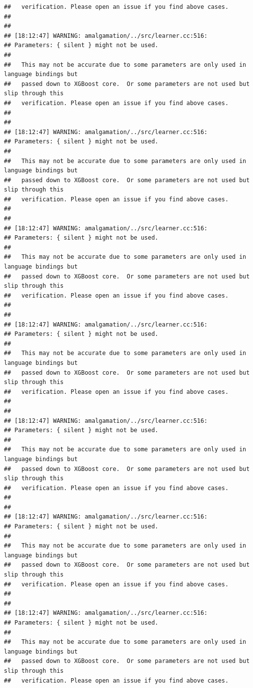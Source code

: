 \documentclass[AMS,STIX2COL]{WileyNJD-v2}\usepackage[]{graphicx}\usepackage[]{color}
\makeatletter
\newenvironment{kframe}{%
 \def\at@end@of@kframe{}%
 \ifinner\ifhmode%
  \def\at@end@of@kframe{\end{minipage}}%
  \begin{minipage}{\columnwidth}%
 \fi\fi%
 \def\FrameCommand##1{\hskip\@totalleftmargin \hskip-\fboxsep
 \colorbox{shadecolor}{##1}\hskip-\fboxsep
     \hskip-\linewidth \hskip-\@totalleftmargin \hskip\columnwidth}%
 \MakeFramed {\advance\hsize-\width
   \@totalleftmargin\z@ \linewidth\hsize
   \@setminipage}}%
 {\par\unskip\endMakeFramed%
 \at@end@of@kframe}
\newenvironment{knitrout}{}{} %
\makeatother
\begin{document}
\begin{knitrout}
\begin{kframe}
\begin{verbatim}
##   verification. Please open an issue if you find above cases.
## 
## 
## [18:12:47] WARNING: amalgamation/../src/learner.cc:516: 
## Parameters: { silent } might not be used.
## 
##   This may not be accurate due to some parameters are only used in language bindings but
##   passed down to XGBoost core.  Or some parameters are not used but slip through this
##   verification. Please open an issue if you find above cases.
## 
## 
## [18:12:47] WARNING: amalgamation/../src/learner.cc:516: 
## Parameters: { silent } might not be used.
## 
##   This may not be accurate due to some parameters are only used in language bindings but
##   passed down to XGBoost core.  Or some parameters are not used but slip through this
##   verification. Please open an issue if you find above cases.
## 
## 
## [18:12:47] WARNING: amalgamation/../src/learner.cc:516: 
## Parameters: { silent } might not be used.
## 
##   This may not be accurate due to some parameters are only used in language bindings but
##   passed down to XGBoost core.  Or some parameters are not used but slip through this
##   verification. Please open an issue if you find above cases.
## 
## 
## [18:12:47] WARNING: amalgamation/../src/learner.cc:516: 
## Parameters: { silent } might not be used.
## 
##   This may not be accurate due to some parameters are only used in language bindings but
##   passed down to XGBoost core.  Or some parameters are not used but slip through this
##   verification. Please open an issue if you find above cases.
## 
## 
## [18:12:47] WARNING: amalgamation/../src/learner.cc:516: 
## Parameters: { silent } might not be used.
## 
##   This may not be accurate due to some parameters are only used in language bindings but
##   passed down to XGBoost core.  Or some parameters are not used but slip through this
##   verification. Please open an issue if you find above cases.
## 
## 
## [18:12:47] WARNING: amalgamation/../src/learner.cc:516: 
## Parameters: { silent } might not be used.
## 
##   This may not be accurate due to some parameters are only used in language bindings but
##   passed down to XGBoost core.  Or some parameters are not used but slip through this
##   verification. Please open an issue if you find above cases.
## 
## 
## [18:12:47] WARNING: amalgamation/../src/learner.cc:516: 
## Parameters: { silent } might not be used.
## 
##   This may not be accurate due to some parameters are only used in language bindings but
##   passed down to XGBoost core.  Or some parameters are not used but slip through this
##   verification. Please open an issue if you find above cases.

\end{verbatim}
\end{kframe}
\end{knitrout}
\end{document}
